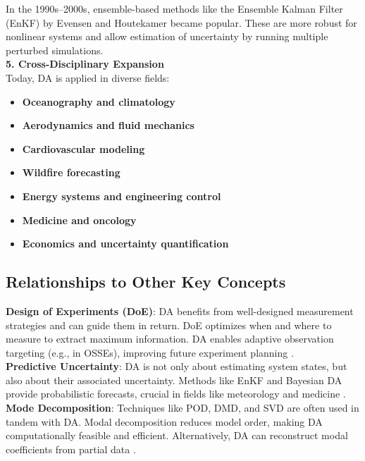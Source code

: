 \documentclass[a4paper]{article}
\begin{document}
In the 1990s–2000s, ensemble-based methods like the Ensemble Kalman Filter (EnKF) by Evensen and Houtekamer 
became popular. These are more robust for nonlinear systems and allow estimation of uncertainty by running 
multiple perturbed simulations.\\

\textbf{5. Cross-Disciplinary Expansion}\\

Today, DA is applied in diverse fields:
\begin{itemize}
    \item \textbf{Oceanography and climatology}
    \item \textbf{Aerodynamics and fluid mechanics}
    \item \textbf{Cardiovascular modeling} \parencite{bertoglio2012identification}
    \item \textbf{Wildfire forecasting} \parencite{rochoux2020towards}
    \item \textbf{Energy systems and engineering control} \parencite{saredi2022state}
    \item \textbf{Medicine and oncology} \parencite{maier2021bayesian}
    \item \textbf{Economics and uncertainty quantification} \parencite{wikle2007bayesian}
\end{itemize}

\subsection{Relationships to Other Key Concepts}

\textbf{Design of Experiments (DoE)}: DA benefits from well-designed measurement strategies and can guide 
them in return. DoE optimizes when and where to measure to extract maximum information. DA enables adaptive 
observation targeting (e.g., in OSSEs), improving future experiment planning \parencite{kalnay2003atmospheric}.\\

\textbf{Predictive Uncertainty}: DA is not only about estimating system states, but also about their 
associated uncertainty. Methods like EnKF and Bayesian DA provide probabilistic forecasts, crucial in 
fields like meteorology and medicine \parencite{evensen1994sequential, wikle2007bayesian}.\\

\textbf{Mode Decomposition}: Techniques like POD, DMD, and SVD are often used in tandem with DA. Modal 
decomposition reduces model order, making DA computationally feasible and efficient. Alternatively, DA 
can reconstruct modal coefficients from partial data \parencite{benner2015survey}.\\
\end{document}
